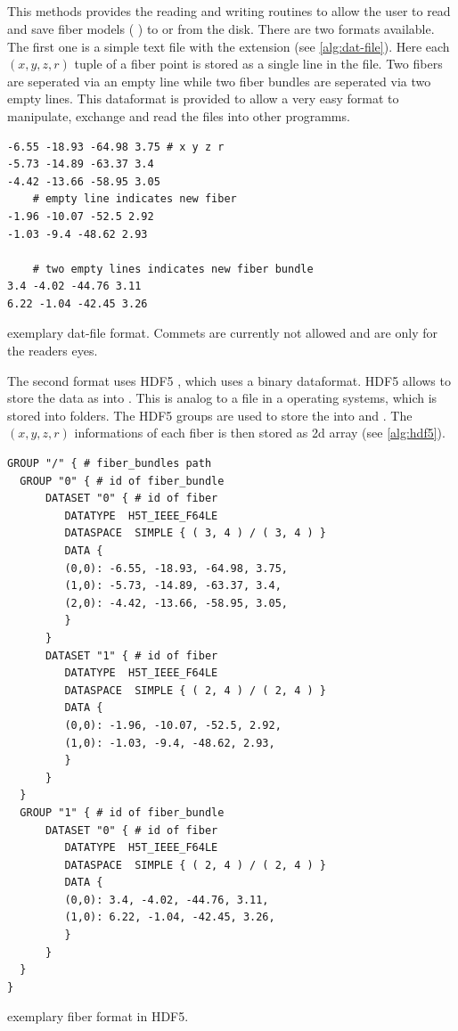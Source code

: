 \subsection{}
%
This methods provides the reading and writing routines to allow the user to read and save fiber models (\ie{} ) to or from the disk.
There are two formats available.
The first one is a simple text file with the extension  (see \cref{alg:dat-file}).
Here each $(x,y,z,r)$ tuple of a fiber point is stored as a single line in the file.
Two fibers are seperated via an empty line while two fiber bundles are seperated via two empty lines.
This dataformat is provided to allow a very easy format to manipulate, exchange and read the files \eg{} into other programms.
%
\begin{lstfloat}[!ht]
\begin{lstlisting}
-6.55 -18.93 -64.98 3.75 # x y z r
-5.73 -14.89 -63.37 3.4
-4.42 -13.66 -58.95 3.05
    # empty line indicates new fiber
-1.96 -10.07 -52.5 2.92
-1.03 -9.4 -48.62 2.93

    # two empty lines indicates new fiber bundle
3.4 -4.02 -44.76 3.11
6.22 -1.04 -42.45 3.26
\end{lstlisting}
\caption{exemplary dat-file format. Commets are currently not allowed and are only for the readers eyes.}\label{alg:dat-file}
\end{lstfloat}
%
%
\par
The second format uses \ac{HDF5} \cite{hdf5}, which uses a binary dataformat.
\ac{HDF5} allows to store the data as  into .
This is analog to a file in a operating systems, which is stored into folders.
The \ac{HDF5} groups are used to store the  into  and .
The $(x,y,z,r)$ informations of each fiber is then stored as 2d array (see \cref{alg:hdf5}).
%
\begin{lstfloat}[!ht]
\begin{lstlisting}
GROUP "/" { # fiber_bundles path
  GROUP "0" { # id of fiber_bundle
      DATASET "0" { # id of fiber
         DATATYPE  H5T_IEEE_F64LE
         DATASPACE  SIMPLE { ( 3, 4 ) / ( 3, 4 ) }
         DATA {
         (0,0): -6.55, -18.93, -64.98, 3.75,
         (1,0): -5.73, -14.89, -63.37, 3.4,
         (2,0): -4.42, -13.66, -58.95, 3.05,
         }
      }
      DATASET "1" { # id of fiber
         DATATYPE  H5T_IEEE_F64LE
         DATASPACE  SIMPLE { ( 2, 4 ) / ( 2, 4 ) }
         DATA {
         (0,0): -1.96, -10.07, -52.5, 2.92,
         (1,0): -1.03, -9.4, -48.62, 2.93,
         }
      }
  }
  GROUP "1" { # id of fiber_bundle
      DATASET "0" { # id of fiber
         DATATYPE  H5T_IEEE_F64LE
         DATASPACE  SIMPLE { ( 2, 4 ) / ( 2, 4 ) }
         DATA {
         (0,0): 3.4, -4.02, -44.76, 3.11,
         (1,0): 6.22, -1.04, -42.45, 3.26,
         }
      }
  }
}
\end{lstlisting}
\caption{exemplary fiber format in \ac{HDF5}.} \label{alg:hdf5}
\end{lstfloat}
%
%
%
